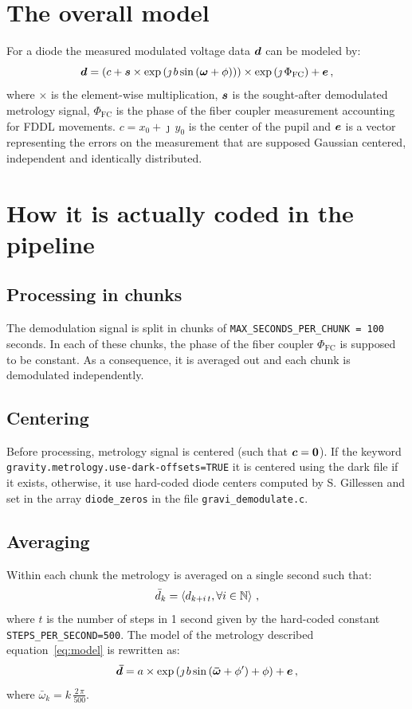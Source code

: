 \documentclass[a4paper,11pt,twoside]{scrartcl}
\begin{document}
\section{The overall model}
For a  diode the measured modulated voltage data $\boldsymbol{d}$ can be modeled by:
\begin{equation}
    \boldsymbol{d} = \left( c + \boldsymbol{s} \times  \exp\left( \jmath \, b \sin\left( \boldsymbol{\omega} + \phi\right)\right)\right)\times\exp\left(\jmath\,\Phi_\textrm{FC}\right)+  \boldsymbol{e}\,,\label{eq:model}
\end{equation}
where $\times$ is the element-wise multiplication, $\boldsymbol{s}$ is the sought-after demodulated  metrology signal, $\Phi_\textrm{FC}$ is the phase of the fiber coupler measurement accounting for FDDL movements. $c  = x_0 + \jmath\,y_0$ is the center of the pupil and $\boldsymbol{e}$ is a vector representing the errors on the measurement that are supposed Gaussian centered, independent and identically distributed.




\section{How it is actually coded in the pipeline}

\subsection{Processing in chunks}
The demodulation signal is split in chunks of  \verb+MAX_SECONDS_PER_CHUNK = 100+ seconds. In each of these chunks, the phase of the fiber coupler $\Phi_\textrm{FC}$ is supposed to be constant. As a consequence, it is averaged out and each chunk is demodulated independently. 

\subsection{Centering}
Before processing, metrology signal is centered (such that $\boldsymbol{c}=\boldsymbol{0}$). If the keyword \verb+gravity.metrology.use-dark-offsets=TRUE+  it is centered using the dark file if it exists, otherwise, it use hard-coded diode centers computed by S. Gillessen and set in the array \verb+diode_zeros+ in the file \verb|gravi_demodulate.c|. 

\subsection{Averaging}
Within each chunk the metrology is averaged on a single second such that:
\begin{equation}
    \bar{d}_k = \left\langle d_{k+i\,t}, \forall i\in \mathbb{N}\right\rangle\,,
\end{equation}
where $t$ is the number of steps in 1 second given by the hard-coded constant \verb|STEPS_PER_SECOND=500|.
The model of the metrology described equation~\ref{eq:model} is rewritten as:
\begin{equation}
    \boldsymbol{\bar{d}} = a \times  \exp\left( \jmath \, b \sin\left( \boldsymbol{\bar{\omega}} + \phi'\right) + \phi\right)+  \boldsymbol{e}\,,\label{eq:modelpip}
\end{equation}
where $\bar{\omega}_k = k\,\frac{2\,\pi}{500}$.
\end{document}
